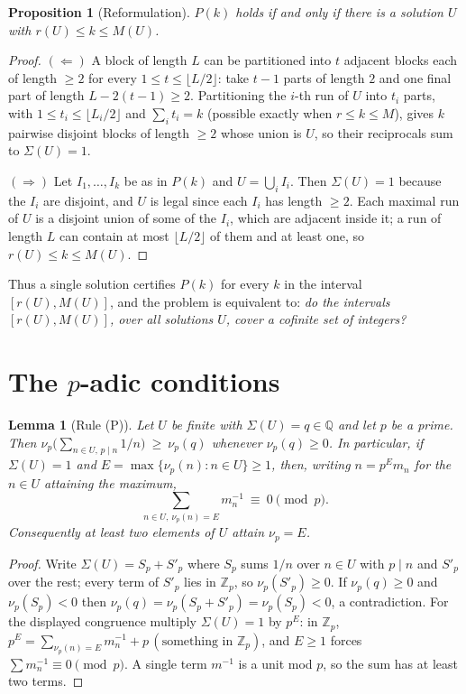 \documentclass[11pt]{article}
\newtheorem{proposition}[theorem]{Proposition}
\newtheorem{lemma}[theorem]{Lemma}
\theoremstyle{definition}
\begin{document}
\begin{proposition}[Reformulation]\label{prop:reform}
$P(k)$ holds if and only if there is a solution $U$ with $r(U)\le k\le M(U)$.
\end{proposition}

\begin{proof}
$(\Leftarrow)$ A block of length $L$ can be partitioned into $t$ adjacent blocks each of
length $\ge2$ for every $1\le t\le\lfloor L/2\rfloor$: take $t-1$ parts of length $2$ and one
final part of length $L-2(t-1)\ge2$. Partitioning the $i$-th run of $U$ into $t_i$ parts,
with $1\le t_i\le\lfloor L_i/2\rfloor$ and $\sum_i t_i=k$ (possible exactly when
$r\le k\le M$), gives $k$ pairwise disjoint blocks of length $\ge2$ whose union is $U$, so
their reciprocals sum to $\Sigma(U)=1$.

$(\Rightarrow)$ Let $I_1,\dots,I_k$ be as in $P(k)$ and $U=\bigcup_i I_i$. Then $\Sigma(U)=1$
because the $I_i$ are disjoint, and $U$ is legal since each $I_i$ has length $\ge2$. Each
maximal run of $U$ is a disjoint union of some of the $I_i$, which are adjacent inside it;
a run of length $L$ can contain at most $\lfloor L/2\rfloor$ of them and at least one, so
$r(U)\le k\le M(U)$.
\end{proof}

Thus a single solution certifies $P(k)$ for every $k$ in the interval $[r(U),M(U)]$, and the
problem is equivalent to: \emph{do the intervals $[r(U),M(U)]$, over all solutions $U$, cover
a cofinite set of integers?}

\section{The $p$-adic conditions}

\begin{lemma}[Rule (P)]\label{lem:P}
Let $U$ be finite with $\Sigma(U)=q\in\mathbb{Q}$ and let $p$ be a prime. Then
$\nu_p\bigl(\sum_{n\in U,\,p\mid n}1/n\bigr)\ \ge\ \nu_p(q)$ whenever $\nu_p(q)\ge0$.
In particular, if $\Sigma(U)=1$ and $E=\max\{\nu_p(n):n\in U\}\ge1$, then, writing
$n=p^{E}m_n$ for the $n\in U$ attaining the maximum,
\[
\sum_{n\in U,\ \nu_p(n)=E} m_n^{-1}\ \equiv\ 0 \pmod p .
\]
Consequently at least two elements of $U$ attain $\nu_p=E$.
\end{lemma}

\begin{proof}
Write $\Sigma(U)=S_p+S'_p$ where $S_p$ sums $1/n$ over $n\in U$ with $p\mid n$ and $S'_p$
over the rest; every term of $S'_p$ lies in $\mathbb{Z}_p$, so $\nu_p(S'_p)\ge0$. If
$\nu_p(q)\ge0$ and $\nu_p(S_p)<0$ then $\nu_p(q)=\nu_p(S_p+S'_p)=\nu_p(S_p)<0$, a
contradiction. For the displayed congruence multiply $\Sigma(U)=1$ by $p^{E}$: in
$\mathbb{Z}_p$,
$p^{E}=\sum_{\nu_p(n)=E}m_n^{-1}+p\,(\text{something in }\mathbb{Z}_p)$, and $E\ge1$ forces
$\sum m_n^{-1}\equiv0\pmod p$. A single term $m^{-1}$ is a unit mod $p$, so the sum has at
least two terms.
\end{proof}
\end{document}
